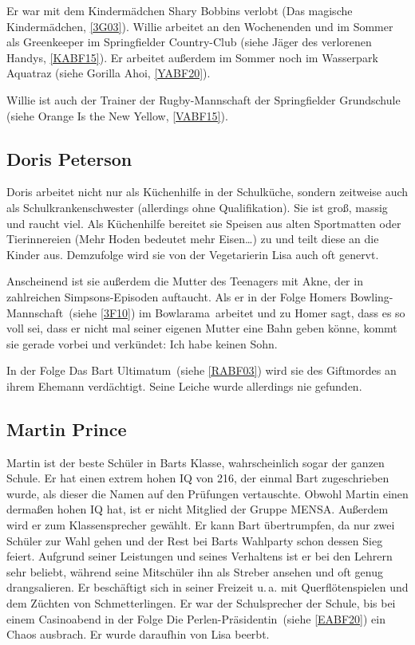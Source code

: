 Er war mit dem Kindermädchen Shary Bobbins verlobt (\glqq Das magische Kindermädchen\grqq , \ref{3G03}). Willie arbeitet an den Wochenenden und im Sommer als Greenkeeper im Springfielder Country-Club (siehe \glqq Jäger des verlorenen Handys\grqq , \ref{KABF15}). Er arbeitet außerdem im Sommer noch im Wasserpark Aquatraz (siehe \glqq Gorilla Ahoi\grqq, \ref{YABF20}).

Willie ist auch der Trainer der Rugby-Mannschaft der Springfielder Grundschule (siehe \glqq Orange Is the New Yellow\grqq , \ref{VABF15}).


\subsection{Doris Peterson}\label{KuechenhilfeDoris}
Doris arbeitet nicht nur als Küchenhilfe in der Schulküche, sondern zeitweise auch als Schulkrankenschwester (allerdings ohne Qualifikation). Sie ist groß, massig und raucht viel. Als Küchenhilfe bereitet sie Speisen aus alten Sportmatten oder Tierinnereien (\glqq Mehr Hoden bedeutet mehr Eisen\dots \grqq ) zu und teilt diese an die Kinder aus. Demzufolge wird sie von der Vegetarierin Lisa auch oft genervt.

Anscheinend ist sie außerdem die Mutter des Teenagers mit Akne, der in zahlreichen Simpsons-Episoden auftaucht. Als er in der Folge \glqq Homers Bowling-Mannschaft\grqq\ (siehe \ref{3F10}) im \glqq Bowlarama\grqq\ arbeitet und zu Homer sagt, dass es so voll sei, dass er nicht mal seiner eigenen Mutter eine Bahn geben könne, kommt sie gerade vorbei und verkündet: \glqq Ich habe keinen Sohn.\grqq 

In der Folge \glqq Das Bart Ultimatum\grqq\ (siehe \ref{RABF03}) wird sie des Giftmordes an ihrem Ehemann verdächtigt. Seine Leiche wurde allerdings nie gefunden.

\subsection{Martin Prince}\label{MartinPrince}
Martin ist der beste Schüler in Barts Klasse, wahrscheinlich sogar der ganzen Schule. Er hat einen extrem hohen IQ von 216, der einmal Bart zugeschrieben wurde, als dieser die Namen auf den Prüfungen vertauschte. Obwohl Martin einen dermaßen hohen IQ hat, ist er nicht Mitglied der Gruppe MENSA. Außerdem wird er zum Klassensprecher gewählt. Er kann Bart übertrumpfen, da nur zwei Schüler zur Wahl gehen und der Rest bei Barts Wahlparty schon dessen Sieg feiert. Aufgrund seiner Leistungen und seines Verhaltens ist er bei den Lehrern sehr beliebt, während seine Mitschüler ihn als Streber ansehen und oft genug drangsalieren. Er beschäftigt sich in seiner Freizeit u.\,a. mit Querflötenspielen und dem Züchten von Schmetterlingen. Er war der Schulsprecher der Schule, bis bei einem Casinoabend in der Folge \glqq Die Perlen-Präsidentin\grqq\ (siehe \ref{EABF20}) ein Chaos ausbrach. Er wurde daraufhin von Lisa beerbt.

